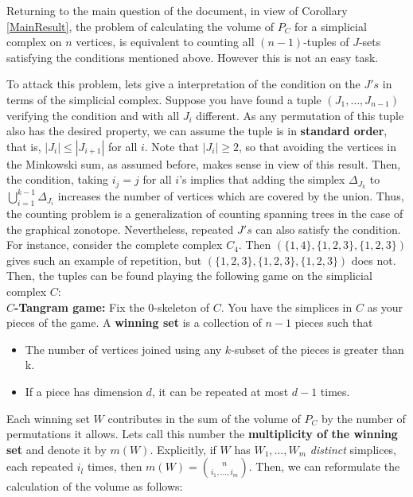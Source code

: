 \documentclass[english,11pt]{article}
\theoremstyle{definition}
\theoremstyle{definition}
\theoremstyle{definition}
\theoremstyle{remark}
\theoremstyle{definition}
\begin{document}
Returning to the main question of the document, in view of Corollary \ref{MainResult}, the problem of calculating the volume of $P_C$ for a simplicial complex on $n$ vertices, is equivalent to counting all $(n-1)$-tuples of $J$-sets satisfying the conditions mentioned above. However this is not an easy task. 

To attack this problem, lets give a interpretation of the condition on the $J's$ in terms of the simplicial complex. Suppose you have found a tuple $(J_1,\ldots,J_{n-1})$ verifying the condition and with all $J_i$ different. As any permutation of this tuple also has the desired property, we can assume the tuple is in \textbf{standard order}, that is, $|J_i|\leq |J_{i+1}|$ for all $i$. Note that $|J_i|\geq 2$, so that avoiding the vertices in the Minkowski sum, as assumed before, makes sense in view of this result. Then, the condition, taking $i_j = j$ for all $i$'s implies that adding the simplex $\Delta_{J_k}$ to $\bigcup_{i=1}^{k-1}\Delta_{J_i}$ increases the number of vertices which are covered by the union. Thus, the counting problem is a generalization of counting spanning trees in the case of the graphical zonotope. Nevertheless, repeated $J's$ can also satisfy the condition. For instance, consider the complete complex $C_4$. Then $\left( \{ 1,4 \}, \{1,2,3\}, \{1,2,3\} \right)$ gives such an example of repetition, but $\left( \{ 1,2,3 \}, \{1,2,3\}, \{1,2,3\} \right)$ does not. Then, the tuples can be found playing the following game on the simplicial complex $C$:\\

\textbf{$C$-Tangram game:} Fix the 0-skeleton of $C$. You have the simplices in $C$ as your pieces of the game. A \textbf{winning set} is a collection of $n-1$ pieces such that
\begin{itemize}
    \item The number of vertices joined using any $k$-subset of the pieces is greater than k. 
    \item If a piece has dimension $d$, it can be repeated at most $d-1$ times. 
\end{itemize}

Each winning set ${W}$ contributes in the sum of the volume of $P_C$ by the number of permutations it allows. Lets call this number the \textbf{multiplicity of the winning set} and denote it by $m({W})$. Explicitly, if ${W}$ has $W_1,\ldots,W_m$ \textit{distinct} simplices, each repeated $i_l$ times, then $m({W}) = {{n}\choose {i_1,\ldots,i_m}}$. Then, we can reformulate the calculation of the volume as follows:
\end{document}
